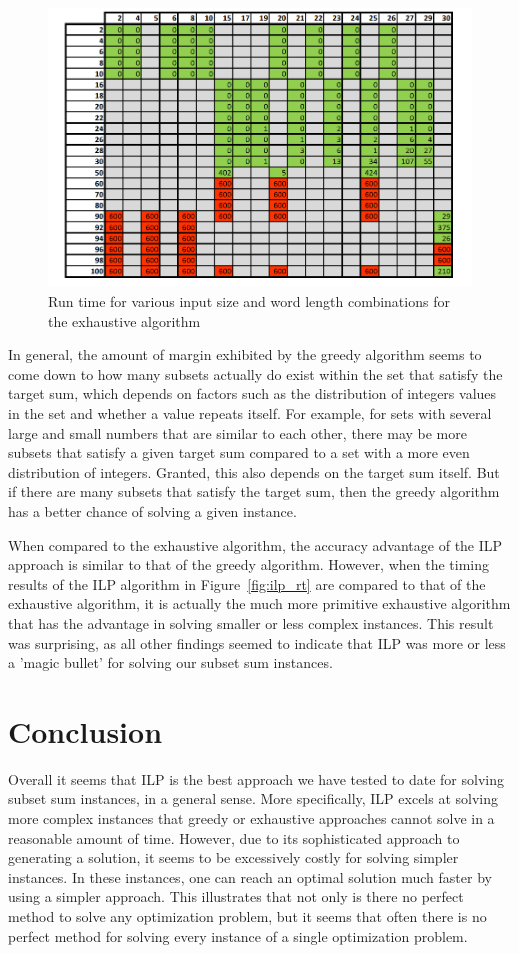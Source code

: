 \documentclass{article}
\begin{document}
\begin{figure}[h]
\centering
\includegraphics[width=12cm]{P1_res.png}
\caption{Run time for various input size and word length combinations for the exhaustive algorithm}
\label{fig:exhaustive}
\end{figure}

In general, the amount of margin exhibited by the greedy algorithm seems to come down to how many
subsets actually do exist within the set that satisfy the target sum, which depends on factors such 
as the distribution of integers values in the set and whether a value repeats itself.
For example, for sets with several large and small numbers that are similar to each other, there may
be more subsets that satisfy a given target sum compared to a set with a more even distribution of integers.
Granted, this also depends on the target sum itself. But if there are many subsets that satisfy the
target sum, then the greedy algorithm has a better chance of solving a given instance. 

When compared to the exhaustive algorithm, the accuracy advantage of the ILP approach is similar to
that of the greedy algorithm. However, when the timing results of the ILP algorithm in Figure~\ref{fig:ilp_rt}
are compared to that of the exhaustive algorithm, it is actually the much more primitive exhaustive
algorithm that has the advantage in solving smaller or less complex instances. This result was surprising,
as all other findings seemed to indicate that ILP was more or less a 'magic bullet' for solving our
subset sum instances.

\section{Conclusion}

Overall it seems that ILP is the best approach we have tested to date for solving subset sum instances, in
a general sense. More specifically, ILP excels at solving more complex instances that greedy or exhaustive
approaches cannot solve in a reasonable amount of time. However, due to its sophisticated approach to generating
a solution, it seems to be excessively costly for solving simpler instances. In these instances, one can reach
an optimal solution much faster by using a simpler approach. This illustrates that not only is there no perfect 
method to solve any optimization problem, but it seems that often there is no perfect method for solving every
instance of a single optimization problem.
\end{document}
